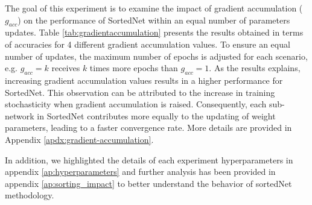 \documentclass[letterpaper]{article} %
\begin{document}
The goal of this experiment is to examine the impact of gradient accumulation ($g_{acc}$) on the performance of SortedNet within an equal number of parameters updates. Table \ref{tab:gradientaccumulation} presents the results obtained in terms of accuracies for 4 different gradient accumulation values. To ensure an equal number of updates, the maximum number of epochs is adjusted for each scenario, e.g. $g_{acc}=k$ receives $k$ times more epochs than $g_{acc}=1$. As the results explains, increasing gradient accumulation values results in a higher performance for SortedNet. This observation can be attributed to the increase in training stochasticity when gradient accumulation is raised. Consequently, each sub-network in SortedNet contributes more equally to the updating of weight parameters, leading to a faster convergence rate. More details are provided in Appendix \ref{apdx:gradient-accumulation}. 

In addition, we highlighted the details of each experiment hyperparameters in appendix \ref{ap:hyperparameters} and further analysis has been provided in appendix \ref{ap:sorting_impact} to better understand the behavior of sortedNet methodology. %

\end{document}
